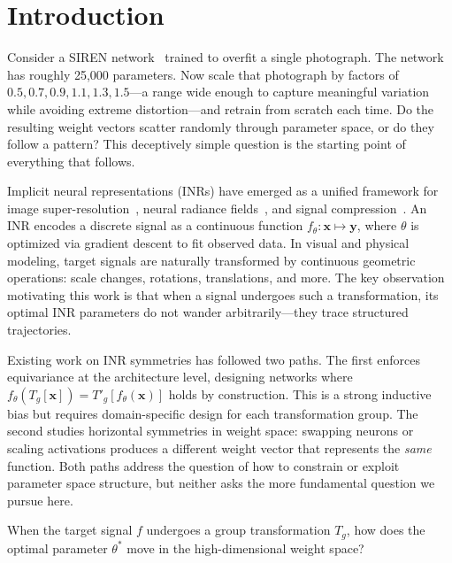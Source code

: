\section{Introduction}
\label{sec:intro}



Consider a SIREN network~\citep{sitzmann2020siren} trained to overfit a single photograph.
The network has roughly 25,000 parameters.
Now scale that photograph by factors of $0.5, 0.7, 0.9, 1.1, 1.3, 1.5$---a range wide enough to capture meaningful variation while avoiding extreme distortion---and retrain from scratch each time.
Do the resulting weight vectors scatter randomly through parameter space, or do they follow a pattern?
This deceptively simple question is the starting point of everything that follows.

Implicit neural representations (INRs) have emerged as a unified framework for image super-resolution~\citep{li2021learning}, neural radiance fields~\citep{mildenhall2020nerf}, and signal compression~\citep{chen2022coin, dupont2022coinpp}.
An INR encodes a discrete signal as a continuous function $f_\theta: \mathbf{x} \mapsto \mathbf{y}$, where $\theta$ is optimized via gradient descent to fit observed data.
In visual and physical modeling, target signals are naturally transformed by continuous geometric operations: scale changes, rotations, translations, and more.
The key observation motivating this work is that when a signal undergoes such a transformation, its optimal INR parameters do not wander arbitrarily---they trace structured trajectories.

Existing work on INR symmetries has followed two paths.
The first enforces equivariance at the architecture level, designing networks where $f_\theta(T_g[\mathbf{x}]) = T'_g[f_\theta(\mathbf{x})]$ holds by construction.
This is a strong inductive bias but requires domain-specific design for each transformation group.
The second studies horizontal symmetries in weight space: swapping neurons or scaling activations produces a different weight vector that represents the \emph{same} function.
Both paths address the question of how to constrain or exploit parameter space structure, but neither asks the more fundamental question we pursue here.

\begin{question*}
When the target signal $f$ undergoes a group transformation $T_g$, how does the optimal parameter $\theta^*$ move in the high-dimensional weight space?
\end{question*}

